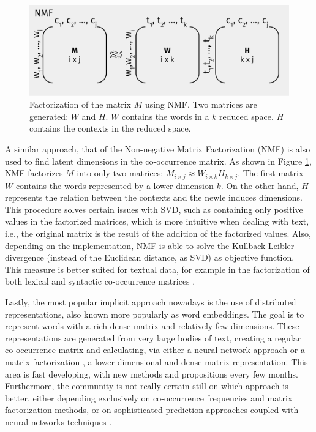 
\begin{figure}
\centering
\includegraphics[width=.8\linewidth]{images/Chapitre2/nmf.pdf}
\caption{Factorization of the matrix $M$ using NMF. Two matrices are generated: $W$ and $H$. $W$ contains the words in a $k$ reduced space. $H$ contains the contexts in the reduced space.}
\label{fig:nmf}
\end{figure}

A similar approach, that of the Non-negative Matrix Factorization \cite{lee2001algorithms} (NMF)  is  also used to find latent  dimensions in the co-occurrence matrix. As shown in Figure \ref{fig:nmf}, NMF factorizes $M$ into only two matrices: $M_{i \times j} \approx W_{i\times k} H_{k\times j}$. The first matrix $W$ contains the words represented by a lower dimension $k$. On the other hand, $H$ represents the relation between the contexts and the newle induces dimensions. This procedure solves certain issues with SVD, such as containing only positive values in the factorized matrices, which is more intuitive when dealing with text, i.e., the original matrix is the result of the addition of the factorized values. Also, depending on the implementation, NMF is able to solve the Kullback-Leibler divergence (instead of the Euclidean distance, as SVD) as objective function. This measure is better suited for textual data, for example in the factorization of both lexical and syntactic co-occurrence matrices \cite{VandeCruys2011}.
 

Lastly, the most popular implicit approach nowadays is the use of distributed representations, also known more popularly as word embeddings. The goal is to represent words with a rich dense matrix and relatively few dimensions. These representations are generated from very large bodies of text, creating a regular co-occurrence matrix and calculating, via either a neural network approach \cite{bengio2003neural,Collobert2011,mikolov2013distributed} or a matrix factorization \cite{pennington2014glove,levy2014neural},  a lower dimensional and dense matrix representation. This area is fast developing, with new methods and propositions every few months. Furthermore, the community is not really certain still on which approach is better, either depending exclusively on co-occurrence frequencies and matrix factorization methods, or on sophisticated prediction approaches coupled with neural networks techniques \cite{baroni2014don,levy2015improving}.



